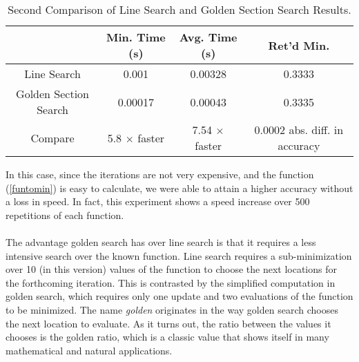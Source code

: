 	\begin{table}[H]
	\centering\makegapedcells
	\begin{tabular}{|| c | c c c ||}
	\cline{2-4}
   \multicolumn{1}{c|}{} & Min. Time (s) & Avg. Time (s) & Ret'd Min. \\
	\hline
	Line Search & 0.001 & 0.00328 & 0.3333 \\
	Golden Section Search & 0.00017 & 0.00043 & 0.3335 \\
	Compare & 5.8 $\times$ faster & 7.54 $\times$ faster & 0.0002 abs. diff. in accuracy \\ 
	\hline
	\end{tabular}
	\caption{Second Comparison of Line Search and Golden Section Search Results.}
	\end{table}
	
	In this case, since the iterations are not very expensive, and the function (\ref{funtomin}) is easy to calculate, we were able to attain a higher accuracy without a loss in speed. In fact, this experiment shows a speed increase over 500 repetitions of each function. 
	\\\\
	The advantage golden search has over line search is that it requires a less intensive search over the known function. Line search requires a sub-minimization over 10 (in this version) values of the function to choose the next locations for the forthcoming iteration. This is contrasted by the simplified computation in golden search, which requires only one update and two evaluations of the function to be minimized. The name \textit{golden} originates in the way golden search chooses the next location to evaluate. As it turns out, the ratio between the values it chooses is the golden ratio, which is a classic value that shows itself in many mathematical and natural applications.
